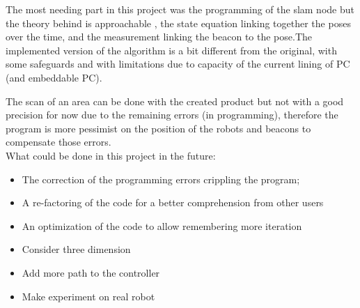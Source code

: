The most needing part in this project was the programming of the slam node but the theory behind is approachable , the state equation linking together the poses over the time, and the measurement linking the beacon to the pose.The implemented version of the algorithm is a bit different from the original, with some safeguards and with limitations due to capacity of the current lining of PC (and embeddable PC).

The scan of an area can be done with the created product but not with a good precision for now due to the remaining errors (in programming), therefore the program is more pessimist on the position of the robots and beacons to compensate those errors.\\

What could be done in this project in the future:
\begin{itemize}[label={$-$},itemsep=0cm,topsep=0cm]
\item The correction of the programming errors crippling the program;
\item A re-factoring of the code for a better comprehension from other users
\item An optimization of the code to allow remembering more iteration
\item Consider three dimension
\item Add more path to the controller
\item Make experiment on real robot
\end{itemize}
